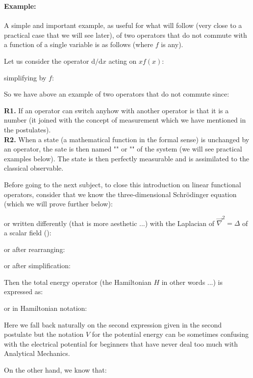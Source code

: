 	\begin{tcolorbox}[colframe=black,colback=white,sharp corners]
	\textbf{{\Large {}}Example:}\\\\
	A simple and important example, as useful for what will follow (very close to a practical case that we will see later), of two operators that do not commute with a function of a single variable is as follows (where $f$ is any). 

	Let us consider the operator $\mathrm{d}/\mathrm{d}x$ acting on $xf(x)$:
	
	simplifying by $f$:
	
	So we have above an example of two operators that do not commute since:
	
	\end{tcolorbox}
	\begin{tcolorbox}[title=Remarks,colframe=black,arc=10pt]
	\textbf{R1.} If an operator can switch anyhow with another operator is that it is a number (it joined with the concept of measurement which we have mentioned in the postulates).\\
	
	\textbf{R2.} When a state (a mathematical function in the formal sense) is unchanged by an operator, the sate is then named "" or "" of the system (we will see practical examples below). The state is then perfectly measurable and is assimilated to the classical observable.
	\end{tcolorbox}
	Before going to the next subject, to close this introduction on linear functional operators, consider that we know the three-dimensional Schrödinger equation (which we will prove further below):
	
	or written differently (that is more aesthetic ...) with the Laplacian of $\vec{\nabla}^2=\Delta$ of a scalar field ():
	
	or after rearranging:
	
	or after simplification:
	
	Then the total energy operator  (the Hamiltonian $H$ in other words ...) is expressed as:
	
	or in Hamiltonian notation:
	
	\begin{tcolorbox}[title=Remark,colframe=black,arc=10pt]
	Here we fall back naturally on the second expression given in the second postulate but the notation $V$ for the potential energy can be sometimes confusing with the electrical potential for beginners that have never deal too much with Analytical Mechanics.
	\end{tcolorbox}
	On the other hand, we know that:
	
